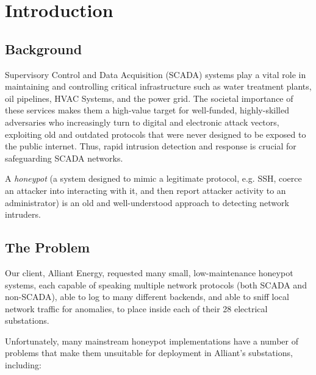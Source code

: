 \section*{\color{NavyBlue}Introduction}
\large

\subsection*{Background}

Supervisory Control and Data Acquisition (SCADA) systems play a vital role in
maintaining and controlling critical infrastructure such as
water treatment plants, oil pipelines, HVAC Systems, and the power grid.
The societal importance of these services makes them a high-value target
for well-funded, highly-skilled adversaries who increasingly turn to digital
and electronic attack vectors, exploiting old and outdated protocols that
were never designed to be exposed to the public internet.
Thus, rapid intrusion detection and response is crucial for safeguarding
SCADA networks.

A \textit{honeypot} (a system designed to mimic a legitimate protocol, e.g.
SSH, coerce an attacker into interacting with it, and then report attacker
activity  to an administrator) is an old and well-understood approach to
detecting network intruders.

\subsection*{The Problem}

Our client, Alliant Energy, requested many small, low-maintenance honeypot
systems,
each capable of speaking multiple network protocols (both SCADA and non-SCADA),
able to log to many different backends, and able to sniff local network traffic
for anomalies, to place inside each of their 28 electrical substations.

Unfortunately, many mainstream honeypot implementations have a number of
problems that make them unsuitable for deployment in Alliant's substations,
including:


